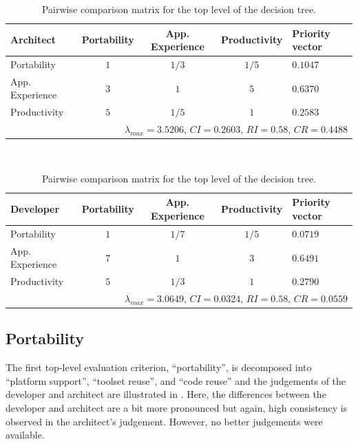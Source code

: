 \begin{table}[h!]
    \centering
    \begin{tabular}{lcccl}
        \hline
        \textbf{Architect}     & Portability & App. Experience & Productivity & Priority vector \\ 
        \hline
        Portability            & $1$         & $1/3$           & $1/5$        & $0.1047$        \\
        App. Experience        & $3$         & $1$             & $5$          & $0.6370$        \\
        Productivity           & $5$         & $1/5$           & $1$          & $0.2583$        \\
        \hline
        \multicolumn{5}{r}{$\lambda_{max} = 3.5206$, $CI = 0.2603$, $RI = 0.58$, $CR = 0.4488$} \\
        \hline
    \end{tabular}
    \\\vspace{1em}
    \begin{tabular}{lcccl}
        \hline
        \textbf{Developer}     & Portability & App. Experience & Productivity & Priority vector \\ 
        \hline
        Portability            & $1$         & $1/7$           & $1/5$        & $0.0719$        \\
        App. Experience        & $7$         & $1$             & $3$          & $0.6491$        \\
        Productivity           & $5$         & $1/3$           & $1$          & $0.2790$        \\
        \hline
        \multicolumn{5}{r}{$\lambda_{max} = 3.0649$, $CI = 0.0324$, $RI = 0.58$, $CR = 0.0559$} \\
        \hline
    \end{tabular}
    \caption{Pairwise comparison matrix for the top level of the decision tree.}
    \label{tab:l1}
\end{table}

\subsection{Portability}

The first top-level evaluation criterion, ``portability'', is decomposed into ``platform support'', ``toolset reuse'', and ``code reuse'' and the judgements of the developer and architect are illustrated in . Here, the differences between the developer and architect are a bit more pronounced but again, high consistency is observed in the architect's judgement. However, no better judgements were available. 

